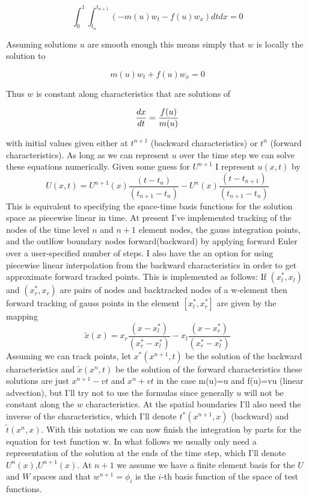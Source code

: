 \documentclass[10pt,dvips,twoside,reqno]{amsart}
\begin{document}
\begin{equation} 
\int_0^1 \int_{t_n}^{t_{n+1}} (- m(u) w_t - f(u) w_x) dt dx =0
\end{equation}

Assuming solutions $u$ are smooth enough this means simply that
$w$ is locally the solution to 

\begin{equation} 
m(u) w_t + f(u) w_x = 0 
\end{equation} 

Thus $w$ is constant along characteristics that are solutions of 

\begin{equation}
\frac{d {x}}{d {t}} = \frac{f(u)}{m(u)} 
\end{equation} 

with initial values given either at $t^{n+1}$ (backward
characteristics) or $t^{n}$ (forward characteristics). As long as we
can represent $u$ over the time step we can solve these equations
numerically. Given some guess for $U^{n+1}$ I represent $u(x,t)$ by
\begin{equation}
U(x,t) = U^{n+1}(x) \frac{(t - t_n)}{(t_{n+1} - t_{n})} - U^{n}(x) \frac{(t - t_{n+1})}{(t_{n+1} - t_{n})} 
\end{equation}
This is equivalent to specifying the space-time basis functions for
the solution space as piecewise linear in time. At present I've
implemented tracking of the nodes of the time level $n$ and $n+1$
element nodes, the gauss integration points, and the outlfow boundary
nodes forward(backward) by applying forward Euler over a
user-specified number of steps. I also have the an option for using
piecewise linear interpolation from the backward characteristics in
order to get approximate forward tracked points. This is implemented as
follows: If $(x^*_l,x_l)$ and $(x^*_r,x_r)$ are pairs of nodes and
backtracked nodes of a w-element then forward tracking of gauss points
in the element $[x^*_l,x^*_r]$ are given by the mapping
\begin{equation}
\tilde{x}(x) = x_r \frac{(x - x^*_l)}{(x^*_r - x^*_l)} - x_l \frac{(x - x^*_r)}{(x^*_r - x^*_l)} 
\end{equation}
Assuming we can track points, let $x^*(x^{n+1},t)$ be the solution of
the backward characteristics and $\tilde{x}(x^n,t)$ be the solution of
the forward characteristics these solutions are just $x^{n+1}-vt$ and
$x^n+vt$ in the case m(u)=u and f(u)=vu (linear advection), but I'll
try not to use the formulas since generally $u$ will not be constant
along the $w$ characteristics. At the spatial boundaries I'll also
need the inverse of the characteristics, which I'll denote
$t^{*}(x^{n+1},x)$ (backward) and $\tilde{t}(x^n,x)$. With this
notation we can now finish the integration by parts for the equation
for test function w. In what follows we usually only need a
representation of the solution at the ends of the
time step, which I'll denote $U^n(x)$,$U^{n+1}(x)$. At ${n+1}$ we assume we have a finite element basis for
the $U$ and $W$ spaces and that $w^{n+1}=\phi_i$ is the $i$-th basis function
of the space of test functions.
 
\end{document}
